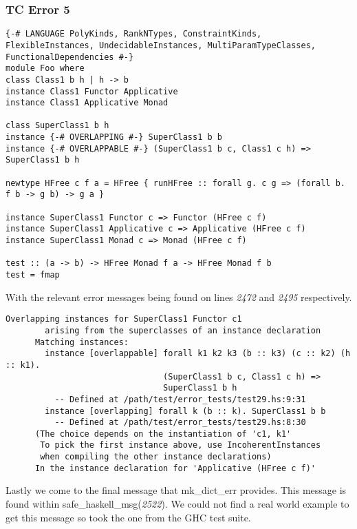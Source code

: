 \documentclass[a4paper]{article}
\begin{document}
\subsubsection{TC Error 5}

\begin{lstlisting}[label={lst: T19.0}, numbers=none, caption={Example Program \cite{ex19}}]
{-# LANGUAGE PolyKinds, RankNTypes, ConstraintKinds, FlexibleInstances, UndecidableInstances, MultiParamTypeClasses, FunctionalDependencies #-}
module Foo where
class Class1 b h | h -> b
instance Class1 Functor Applicative
instance Class1 Applicative Monad

class SuperClass1 b h
instance {-# OVERLAPPING #-} SuperClass1 b b
instance {-# OVERLAPPABLE #-} (SuperClass1 b c, Class1 c h) => SuperClass1 b h

newtype HFree c f a = HFree { runHFree :: forall g. c g => (forall b. f b -> g b) -> g a }

instance SuperClass1 Functor c => Functor (HFree c f)
instance SuperClass1 Applicative c => Applicative (HFree c f)
instance SuperClass1 Monad c => Monad (HFree c f)

test :: (a -> b) -> HFree Monad f a -> HFree Monad f b
test = fmap
\end{lstlisting}

With the relevant error messages being found on lines \textit{2472} and \textit{2495} respectively. 

\begin{lstlisting}[label={lst: T19.0.2}, numbers=none, caption={Error}]
Overlapping instances for SuperClass1 Functor c1
        arising from the superclasses of an instance declaration
      Matching instances:
        instance [overlappable] forall k1 k2 k3 (b :: k3) (c :: k2) (h :: k1).
                                (SuperClass1 b c, Class1 c h) =>
                                SuperClass1 b h
          -- Defined at /path/test/error_tests/test29.hs:9:31
        instance [overlapping] forall k (b :: k). SuperClass1 b b
          -- Defined at /path/test/error_tests/test29.hs:8:30
      (The choice depends on the instantiation of 'c1, k1'
       To pick the first instance above, use IncoherentInstances
       when compiling the other instance declarations)
      In the instance declaration for 'Applicative (HFree c f)'
\end{lstlisting}

Lastly we come to the final message that mk\_dict\_err provides. This message is found within safe\_haskell\_msg(\textit{2522}). We could not find a real world example to get this message so took the one from the GHC test suite.
\end{document}
